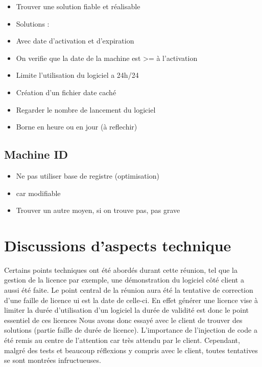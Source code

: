 \documentclass{article}
\begin{document}
\begin{itemize}
    \item Trouver une solution fiable et réalisable
    \item Solutions :
    \item Avec date d'activation et d'expiration
    \item On verifie que la date de la machine est >= à l'activation
    \item Limite l'utilisation du logiciel a 24h/24
    \item Création d'un fichier date caché 
    \item Regarder le nombre de lancement du logiciel
    \item Borne en heure ou en jour (à reflechir)
\end{itemize}

\subsection{Machine ID}

\begin{itemize}
    \item Ne pas utiliser base de registre (optimisation)
    \item car modifiable
    \item Trouver un autre moyen, si on trouve pas, pas grave
\end{itemize}

\section{Discussions d'aspects technique}
Certains points techniques ont été abordés durant cette réunion, tel que la gestion de la licence par exemple, une démonstration
du logiciel côté client a aussi été faite. Le point central de la réunion aura été la tentative de correction d'une faille de licence ui est la date
de celle-ci. En effet générer une licence vise à limiter la durée d'utilisation d'un logiciel la durée de validité est donc le point essentiel de ces licences
Nous avons donc essayé avec le client de trouver des solutions (partie faille de durée de licence). L'importance de l'injection de code a été remis au 
centre de l'attention car très attendu par le client. Cependant, malgré des tests et beaucoup réflexions y compris avec le client, toutes tentatives se sont montrées infructueuses.

\newpage
\end{document}
